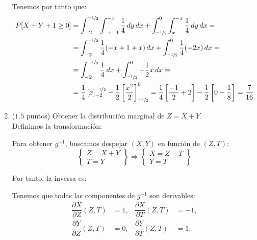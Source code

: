 \documentclass[12pt]{article}
\begin{document}
\begin{ejercicio}
\begin{enumerate}
            Tenemos por tanto que:
            \begin{align*}
                P[X + Y + 1 \geq 0] &= \int_{-2}^{\nicefrac{-1}{2}} \int_{-x-1}^{-x} \dfrac{1}{4} \, dy \, dx + \int_{\nicefrac{-1}{2}}^{0} \int_{x}^{-x} \dfrac{1}{4} \, dy \, dx
                =\\&= \int_{-2}^{\nicefrac{-1}{2}} \dfrac{1}{4}(-x+1+x) \, dx + \int_{\nicefrac{-1}{2}}^{0} \dfrac{1}{4}(-2x) \, dx
                =\\&= \int_{-2}^{\nicefrac{-1}{2}} \dfrac{1}{4} \, dx + \int_{\nicefrac{-1}{2}}^{0} -\dfrac{1}{2}x \, dx
                =\\&= \dfrac{1}{4}\left[x\right]_{-2}^{\nicefrac{-1}{2}} - \dfrac{1}{2}\left[\dfrac{x^2}{2}\right]_{\nicefrac{-1}{2}}^{0}
                = \dfrac{1}{4}\left[\dfrac{-1}{2}+2\right] - \dfrac{1}{2}\left[0 - \dfrac{1}{8}\right] = \dfrac{7}{16}
            \end{align*}
            \item ($1.5$ puntos) Obtener la distribución marginal de $Z = X + Y$.\\
            
            Definimos la transformación:

            Para obtener $g^{-1}$, buscamos despejar $(X,Y)$ en función de $(Z,T)$:
            \begin{equation*}
                \left\{
                    \begin{array}{l}
                        Z=X+Y\\
                        T=Y
                    \end{array}
                \right\}
                \Longrightarrow
                \left\{
                    \begin{array}{l}
                        X=Z-T\\
                        Y=T
                    \end{array}
                \right\}
            \end{equation*}

            Por tanto, la inversa es:

            Tenemos que todas las componentes de $g^{-1}$ son derivables:
            \begin{align*}
                \dfrac{\partial X}{\partial Z}(Z,T)&=1, & \dfrac{\partial X}{\partial T}(Z,T)&=-1,\\
                \dfrac{\partial Y}{\partial Z}(Z,T)&=0, & \dfrac{\partial Y}{\partial T}(Z,T)&=1.
            \end{align*}


\end{enumerate}
\end{ejercicio}
\end{document}
